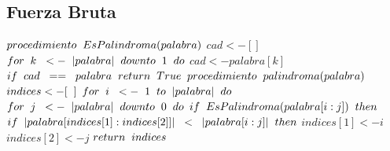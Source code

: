 \documentclass{article}
\begin{document}
\subsection{Fuerza Bruta}
\(procedimiento\hspace{0,2cm}EsPalindroma(palabra)\)\newline
\indent\(cad<-[]\)\newline
\indent\(for\hspace{0,2cm}k\hspace{0,2cm}<-\hspace{0,2cm}|palabra|\hspace{0,2cm}downto\hspace{0,2cm}1\hspace{0,2cm}do\)\newline
\indent\indent\(cad<-palabra[k]\)\newline
\indent\(if\hspace{0,2cm}cad\hspace{0,2cm}==\hspace{0,2cm}palabra\hspace{0,2cm}return\hspace{0,2cm}True\)\newline
\newline
\(procedimiento\hspace{0,2cm}palindroma(palabra)\)\newline
\indent\(indices <- [\hspace{0,2cm}]\)\newline
\indent\(for\hspace{0,2cm}i\hspace{0,2cm}<-\hspace{0,2cm}1\hspace{0,2cm}to\hspace{0,2cm}|palabra|\hspace{0,2cm}do\)\newline
\indent\indent \(for\hspace{0,2cm}j\hspace{0,2cm}<-\hspace{0,2cm}|palabra|\hspace{0,2cm}downto\hspace{0,2cm}0\hspace{0,2cm}do\)\newline
\indent\indent \indent \(if\hspace{0,2cm}EsPalindroma(palabra[i:j])\hspace{0,2cm}then\)\newline
\indent\indent \indent \indent\(if\hspace{0,2cm}|palabra[indices[1]:indices[2]]|\hspace{0,2cm}<\hspace{0,2cm}|palabra[i:j]|\hspace{0,2cm}then\)\newline
\indent\indent \indent \indent\indent\(indices[1]<-i\)\newline
\indent\indent \indent \indent\indent\(indices[2]<-j\)\newline
\indent\(return\hspace{0,2cm}indices\)
\end{document}
